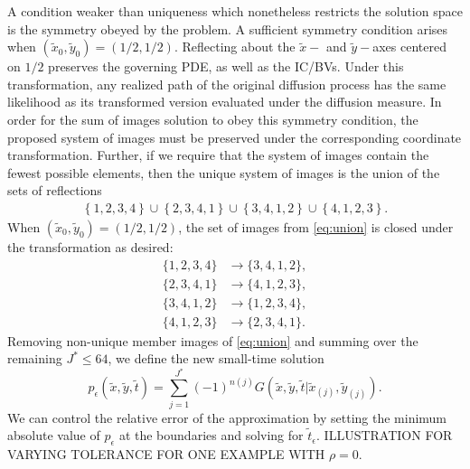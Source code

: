 A condition weaker than uniqueness which nonetheless restricts the
solution space is the symmetry obeyed by the problem. A sufficient
symmetry condition arises when
$(\tilde{x}_0, \tilde{y}_0) = (1/2, 1/2)$. Reflecting
about the $\tilde{x}-$ and $\tilde{y}-$axes centered on $1/2$
preserves the governing PDE, as well as the IC/BVs. Under this
transformation, any realized path of the original diffusion process
has the same likelihood as its transformed version evaluated under the
diffusion measure. In order for the sum of images solution to obey
this symmetry condition, the proposed system of images must be
preserved under the corresponding coordinate transformation. Further,
if we require that the system of images contain the fewest possible
elements, then the unique system of images is the union of the sets of
reflections
\begin{align}
  \left\{ 1,2,3,4 \right\} \cup \left\{ 2,3,4,1 \right\} \cup \left\{ 3,4,1,2 \right\} \cup \left\{ 4,1,2,3 \right\}. \label{eq:union}
\end{align}
When $(\tilde{x}_0, \tilde{y}_0) = (1/2,1/2)$, the set of
images from \eqref{eq:union} is closed under the transformation as
desired:
\begin{align*}
  \{1,2,3,4 \} & \to \{3,4,1,2 \}, \\
  \{2,3,4,1 \} &\to \{4,1,2,3 \}, \\
  \{3,4,1,2 \} &\to \{1,2,3,4 \}, \\
  \{4,1,2,3 \} &\to \{2,3,4,1 \}.
\end{align*}
Removing non-unique member images of \eqref{eq:union} and summing over
the remaining $J^* \leq 64$, we define the new small-time solution
\begin{equation}
  p_\epsilon(\tilde{x}, \tilde{y}, \tilde{t}) = \sum_{j=1}^{J^*} (-1)^{n(j)}
  G(\tilde{x},\tilde{y},\tilde{t}|\tilde{x}_{(j)},\tilde{y}_{(j)}). \label{eq:small-time-sol}
\end{equation}
We can control the relative error of the approximation by setting the
minimum absolute value of $p_\epsilon$ at the boundaries and solving
for $\tilde{t}_\epsilon$. ILLUSTRATION FOR VARYING TOLERANCE FOR ONE
EXAMPLE WITH $\rho = 0$.
